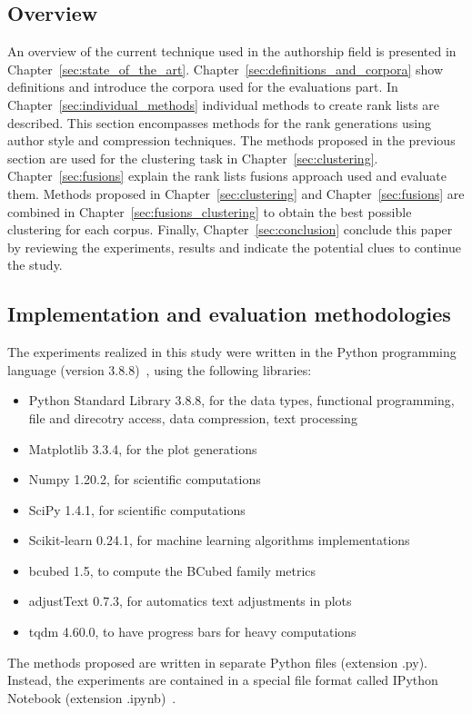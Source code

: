 \subsection{Overview}

An overview of the current technique used in the authorship field is presented in Chapter~\ref{sec:state_of_the_art}.
Chapter~\ref{sec:definitions_and_corpora} show definitions and introduce the corpora used for the evaluations part.
In Chapter~\ref{sec:individual_methods} individual methods to create rank lists are described.
This section encompasses methods for the rank generations using author style and compression techniques.
The methods proposed in the previous section are used for the clustering task in Chapter~\ref{sec:clustering}.
Chapter~\ref{sec:fusions} explain the rank lists fusions approach used and evaluate them.
Methods proposed in Chapter~\ref{sec:clustering} and Chapter~\ref{sec:fusions} are combined in Chapter~\ref{sec:fusions_clustering} to obtain the best possible clustering for each corpus.
Finally, Chapter~\ref{sec:conclusion} conclude this paper by reviewing the experiments, results and indicate the potential clues to continue the study.

\subsection{Implementation and evaluation methodologies}

The experiments realized in this study were written in the Python programming language (version 3.8.8)~\cite{python}, using the following libraries:
\begin{itemize}
  \item Python Standard Library 3.8.8, for the data types, functional programming, file and direcotry access, data compression, text processing~\cite{python_standard_library}
  \item Matplotlib 3.3.4, for the plot generations~\cite{matplotlib}
  \item Numpy 1.20.2, for scientific computations~\cite{numpy}
  \item SciPy 1.4.1, for scientific computations~\cite{scipy}
  \item Scikit-learn 0.24.1, for machine learning algorithms implementations~\cite{sklearn}
  \item bcubed 1.5, to compute the BCubed family metrics~\cite{bcubed_gh}
  \item adjustText 0.7.3, for automatics text adjustments in plots~\cite{adjustText}
  \item tqdm 4.60.0, to have progress bars for heavy computations~\cite{tqdm}
\end{itemize}
The methods proposed are written in separate Python files (extension .py).
Instead, the experiments are contained in a special file format called IPython Notebook (extension .ipynb)~\cite{jupyter}.

